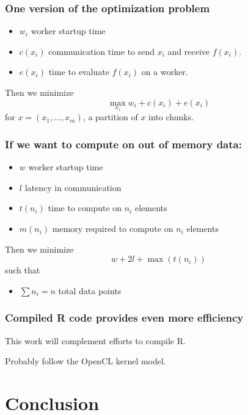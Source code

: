 \documentclass{beamer}
\begin{document}
\begin{frame}

    \frametitle{One version of the optimization problem}

\begin{itemize}
    \item $w_i$ worker startup time
    \item $c(x_i)$ communication time to send $x_i$ and receive $f(x_i)$.
    \item $e(x_i)$ time to evaluate $f(x_i)$ on a worker.
\end{itemize}

Then we minimize
\[
    \max_{x_i} w_i + c(x_i) + e(x_i)
\]
for $x = (x_1, \dots, x_m)$, a partition of $x$ into chunks.

\end{frame}
\begin{frame}

    \frametitle{If we want to compute on out of memory data:}

\begin{itemize}
    \item $w$ worker startup time
    \item $l$ latency in communication
    \item $t(n_i)$ time to compute on $n_i$ elements
    \item $m(n_i)$ memory required to compute on $n_i$ elements
\end{itemize}

Then we minimize
\[
    w + 2l + \max (t(n_i))
\]
such that 

\begin{itemize}
    \item $\sum n_i = n$ total data points
\end{itemize}


\end{frame}
\begin{frame}

    \frametitle{Compiled R code provides even more efficiency}

    This work will complement efforts to compile R.

Probably follow the OpenCL kernel model.

\end{frame}
\section{Conclusion}
\end{document}
